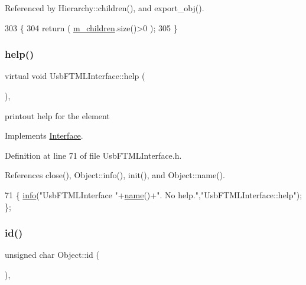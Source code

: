 Referenced by Hierarchy\+::children(), and export\+\_\+obj().


\begin{DoxyCode}
303                               \{
304   \textcolor{keywordflow}{return} ( \hyperlink{classHierarchy_a038816763941fd4a930504917f60483b}{m\_children}.size()>0 );
305 \}
\end{DoxyCode}
\mbox{\label{classUsbFTMLInterface_a1cfe65c58531afc07c21d876e21d8e46}} 
\subsubsection{\texorpdfstring{help()}{help()}}
{\footnotesize\ttfamily virtual void Usb\+F\+T\+M\+L\+Interface\+::help (\begin{DoxyParamCaption}{ }\end{DoxyParamCaption})\hspace{0.3cm}{\ttfamily [inline]}, {\ttfamily [virtual]}}

printout help for the element 

Implements \hyperlink{classInterface_aedd3cf1d964c837e7848ccf81dc9c760}{Interface}.



Definition at line 71 of file Usb\+F\+T\+M\+L\+Interface.\+h.



References close(), Object\+::info(), init(), and Object\+::name().


\begin{DoxyCode}
71 \{ \hyperlink{classObject_a644fd329ea4cb85f54fa6846484b84a8}{info}(\textcolor{stringliteral}{"UsbFTMLInterface "}+\hyperlink{classObject_a300f4c05dd468c7bb8b3c968868443c1}{name}()+\textcolor{stringliteral}{". No help."},\textcolor{stringliteral}{"UsbFTMLInterface::help"}); \};
\end{DoxyCode}
\mbox{\label{classObject_af99145335cc61ff6e2798ea17db009d2}} 
\subsubsection{\texorpdfstring{id()}{id()}}
{\footnotesize\ttfamily unsigned char Object\+::id (\begin{DoxyParamCaption}{ }\end{DoxyParamCaption})\hspace{0.3cm}{\ttfamily [inline]}, {\ttfamily [inherited]}}




